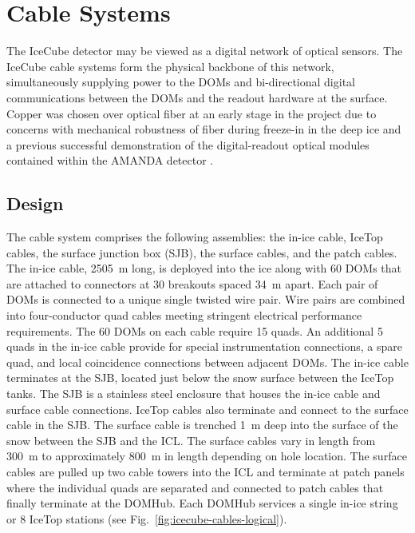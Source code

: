 \section{\label{sec:cable}Cable Systems}

The IceCube detector may be viewed as a digital network of optical
sensors. The IceCube cable systems form the physical backbone of this
network, simultaneously supplying power to the DOMs and bi-directional
digital communications between the DOMs and the readout hardware at the
surface. Copper was chosen over optical fiber at an early stage in the
project due to concerns with mechanical robustness of fiber during
freeze-in in the deep ice and a previous successful demonstration of the
digital-readout optical modules contained within the AMANDA detector
\cite{AMANDA:string18}. 

\subsection{Design}

The cable system comprises the following assemblies: the in-ice cable,
IceTop cables, the surface junction box (SJB), the surface cables, and the patch
cables. The in-ice cable, 2505~m long, is deployed
into the ice along with 60 DOMs that are attached to connectors at 30
breakouts spaced 34~m apart. Each pair of DOMs is connected to a unique
single twisted wire pair. Wire pairs are combined into four-conductor quad
cables meeting stringent electrical performance requirements. The 60
DOMs on each cable require 15 quads. An additional 5 quads in the
in-ice cable provide for special instrumentation connections, a spare quad,
and local coincidence connections between adjacent DOMs. The in-ice
cable terminates at the SJB, located just below the snow surface between
the IceTop tanks. The SJB is a stainless steel
enclosure that houses the in-ice cable and surface cable
connections. IceTop cables also terminate and connect to the surface cable
in the SJB. The surface cable is trenched 1~m deep into the
surface of the snow between the SJB and the ICL. The surface
cables vary in length from 300~m to approximately 800~m in length depending on hole location. The surface cables are
pulled up two cable towers into the ICL and terminate at patch panels where the individual
quads are separated and connected to patch cables that finally terminate at the DOMHub. Each
DOMHub services a single in-ice string or 8 IceTop stations (see
Fig.~\ref{fig:icecube-cables-logical}). 


